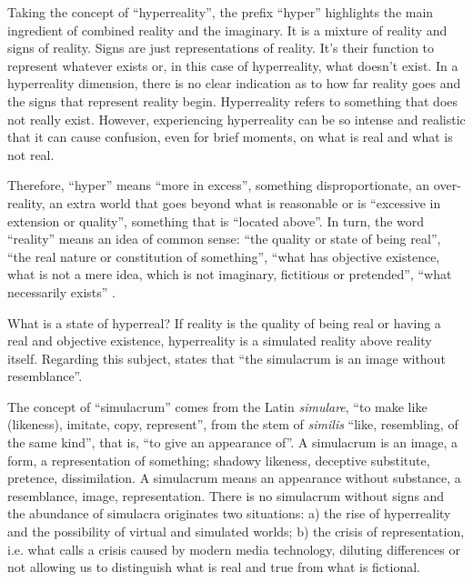 \documentclass[english]{textolivre}
\begin{document}
Taking the concept of “hyperreality”, the prefix “hyper” highlights the main ingredient of combined reality and the imaginary. It is a mixture of reality and signs of reality. Signs are just representations of reality. It’s their function to represent whatever exists or, in this case of hyperreality, what doesn’t exist. In a hyperreality dimension, there is no clear indication as to how far reality goes and the signs that represent reality begin. Hyperreality refers to something that does not really exist. However, experiencing hyperreality can be so intense and realistic that it can cause confusion, even for brief moments, on what is real and what is not real.

Therefore, “hyper” means “more in excess”, something disproportionate, an over-reality, an extra world that goes beyond what is reasonable or is “excessive in extension or quality”, something that is “located above”. In turn, the word “reality” means an idea of common sense: “the quality or state of being real”, “the real nature or constitution of something”, “what has objective existence, what is not a mere idea, which is not imaginary, fictitious or pretended”, “what necessarily exists” \cite[p.~379]{barroso_contributions_2020}.

What is a state of hyperreal? If reality is the quality of being real or having a real and objective existence, hyperreality is a simulated reality above reality itself. Regarding this subject, \textcite[p.~48]{deleuze_plato_1983} states that “the simulacrum is an image without resemblance”.

The concept of “simulacrum” comes from the Latin \textit{simulare}, “to make like (likeness), imitate, copy, represent”, from the stem of \textit{similis} “like, resembling, of the same kind”, that is, “to give an appearance of”. A simulacrum is an image, a form, a representation of something; shadowy likeness, deceptive substitute, pretence, dissimilation. A simulacrum means an appearance without substance, a resemblance, image, representation. There is no simulacrum without signs and the abundance of simulacra originates two situations: a) the rise of hyperreality and the possibility of virtual and simulated worlds; b) the crisis of representation, i.e. what \textcite[p.~112]{virilio_lost_1991} calls a crisis caused by modern media technology, diluting differences or not allowing us to distinguish what is real and true from what is fictional.
\end{document}
